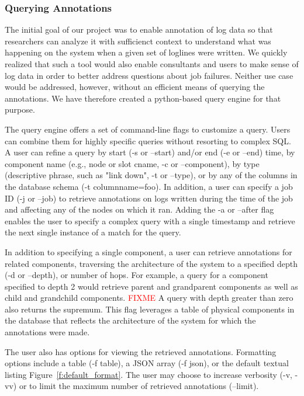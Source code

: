 \subsubsection{Querying Annotations}
\label{s:querying}
The initial goal of our project was to enable annotation of log data so that researchers can analyze it with sufficienct context to understand what was happening on the system when a given set of loglines were written. We quickly realized that such a tool would also enable consultants and users to make sense of log data in order to better address questions about job failures. Neither use case would be addressed, however, without an efficient means of querying the annotations. We have therefore created a python-based query engine for that purpose.

The query engine offers a set of command-line flags to customize a query. Users can combine them for highly specific queries without resorting to complex SQL. A user can refine a query by start (-s or --start) and/or end (-e or --end) time, by component name (e.g., node or slot cname, -c or --component), by type (descriptive phrase, such as "link down", -t or --type), or by any of the columns in the database schema (-t columnname=foo). In addition, a user can specify a job ID (-j or --job) to retrieve annotations on logs written during the time of the job and affecting any of the nodes on which it ran. Adding the -a or --after flag enables the user to specify a complex query with a single timestamp and retrieve the next single instance of a match for the query.

In addition to specifying a single component, a user can retrieve annotations for related components, traversing the architecture of the system to a specified depth (-d or --depth), or number of hops. For example, a query for a component specified to depth 2 would retrieve parent and grandparent components as well as child and grandchild components. 
\textcolor{red}{FIXME}
A query with depth greater than zero also returns the supremum. 
This flag leverages a table of physical components in the database that reflects the architecture of the system for which the annotations were made. 

The user also has options for viewing the retrieved annotations. Formatting options include a table (-f table), a JSON array (-f json), or the default textual listing Figure~\ref{f:default_format}. The user may choose to increase verbosity (-v, -vv) or to limit the maximum number of retrieved annotations (--limit).


